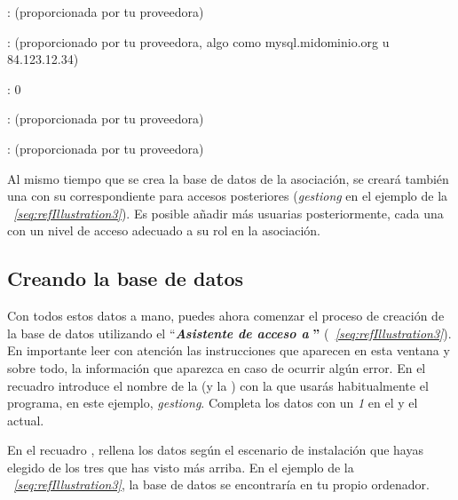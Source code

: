: (proporcionada
por tu proveedora)

: (proporcionado
por tu proveedora, algo como mysql.midominio.org u 84.123.12.34)

: 0

: (proporcionada
por tu proveedora)

:
(proporcionada por tu proveedora)

\smallskip

Al mismo tiempo que se crea la base de datos de la asociación, se
creará también una  con su
correspondiente  para accesos
posteriores ({\textquotesingle}\textit{gestiong{\textquotesingle}} en
el ejemplo de la \textit{\figurename~\ref{seq:refIllustration3}}). Es
posible añadir más usuarias posteriormente, cada una con un nivel
de acceso adecuado a su rol en la asociación. \ 

\subsection[Creando la base de datos]{Creando la base de datos}
Con todos estos datos a mano, puedes ahora comenzar el proceso de
creación de la base de datos utilizando el
{\textquotedblleft}\textbf{\textit{Asistente de acceso a
\appname}}\textbf{{\textquotedblright}}
(\textit{\figurename~\ref{seq:refIllustration3}}). En importante leer
con atención las instrucciones que aparecen en esta ventana y sobre
todo, la información que aparezca en caso de ocurrir algún error.
En el recuadro  introduce el
nombre de la  (y la
) con la que usarás habitualmente
el programa, en este ejemplo,
{\textquotesingle}\textit{gestiong}{\textquotesingle}. Completa los
datos con un \textit{1} en el  y el  actual.

En el recuadro ,
rellena los datos según el escenario de instalación que hayas
elegido de los tres que has visto más arriba. En el ejemplo de la
\textit{\figurename~\ref{seq:refIllustration3}}, la base de datos se
encontraría en tu propio ordenador. 


